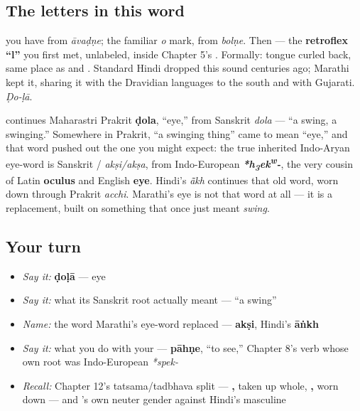 \subsection*{The letters in this word}
\textbf{} you have from \emph{āvaḍṇe}; \textbf{} the familiar \emph{o} mark, from \emph{bolṇe}. Then \textbf{} — the \textbf{retroflex \textquotedblleft{}l\textquotedblright{}} you first met, unlabeled, inside Chapter 5's \textbf{}. Formally: tongue curled back, same place as \textbf{} and \textbf{}. Standard Hindi dropped this sound centuries ago; Marathi kept it, sharing it with the Dravidian languages to the south and with Gujarati. \emph{Ḍo-ḷā}.

\begin{cousinweb}
\textbf{} continues Maharastri Prakrit \textbf{ḍola}, \textquotedblleft{}eye,\textquotedblright{} from Sanskrit \textbf{} \emph{dola} — \textquotedblleft{}a swing, a swinging.\textquotedblright{} Somewhere in Prakrit, \textquotedblleft{}a swinging thing\textquotedblright{} came to mean \textquotedblleft{}eye,\textquotedblright{} and that word pushed out the one you might expect: the true inherited Indo-Aryan eye-word is Sanskrit \textbf{}/\textbf{} \emph{akṣi/akṣa}, from Indo-European \emph{\textbf{*h\textsubscript{3}ek\textsuperscript{w}-}}, the very cousin of Latin \textbf{oculus} and English \textbf{eye}. Hindi's \textbf{} \emph{ā̃kh} continues that old word, worn down through Prakrit \emph{acchi}. Marathi's eye is not that word at all — it is a replacement, built on something that once just meant \emph{swing}.
\end{cousinweb}

\subsection*{Your turn}
\begin{itemize}
\raggedright
  \item \emph{Say it:} \textbf{ḍoḷā} — eye
  \item \emph{Say it:} what its Sanskrit root actually meant — \textquotedblleft{}a swing\textquotedblright{}
  \item \emph{Name:} the word Marathi's eye-word replaced — \textbf{akṣi}, Hindi's \textbf{āṅkh}
  \item \emph{Say it:} what you do with your \textbf{} — \textbf{pāhṇe}, \textquotedblleft{}to see,\textquotedblright{} Chapter 8's verb whose own root was Indo-European \emph{*spek-}
  \item \emph{Recall:} Chapter 12's tatsama/tadbhava split — \textbf{, } taken up whole, \textbf{, } worn down — and \textbf{}'s own neuter gender against Hindi's masculine
\end{itemize}

